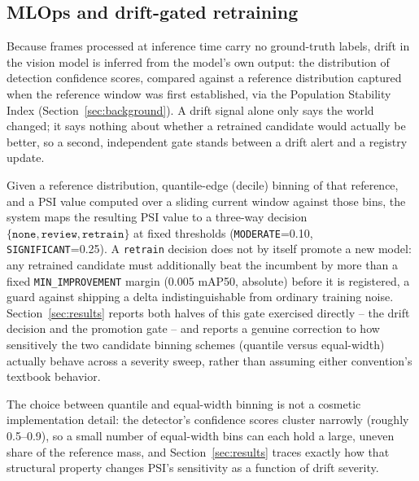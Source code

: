 \subsection{MLOps and drift-gated retraining}
\label{sec:mlops}

Because frames processed at inference time carry no ground-truth labels, drift in the vision model
is inferred from the model's own output: the distribution of detection confidence scores, compared
against a reference distribution captured when the reference window was first established, via the
Population Stability Index
(Section~\ref{sec:background}). A drift signal alone only says the world changed; it says nothing
about whether a retrained candidate would actually be better, so a second, independent gate stands
between a drift alert and a registry update.

\begin{formalization}
\label{form:psigate}
Given a reference distribution, quantile-edge (decile) binning of that reference, and a PSI value
computed over a sliding current window against those bins, the system maps the resulting PSI value
to a three-way decision $\{\texttt{none}, \texttt{review}, \texttt{retrain}\}$ at fixed thresholds
(\texttt{MODERATE}=0.10, \texttt{SIGNIFICANT}=0.25). A \texttt{retrain} decision does not by itself
promote a new model: any retrained candidate must additionally beat the incumbent by more than a
fixed \texttt{MIN\_IMPROVEMENT} margin (0.005 mAP50, absolute) before it is registered, a guard
against shipping a delta indistinguishable from ordinary training noise. Section~\ref{sec:results}
reports both halves of this gate exercised directly -- the drift decision and the promotion gate --
and reports a genuine correction to how sensitively the two candidate binning schemes (quantile
versus equal-width) actually behave across a severity sweep, rather than assuming either
convention's textbook behavior.
\end{formalization}

The choice between quantile and equal-width binning is not a cosmetic implementation detail: the
detector's confidence scores cluster narrowly (roughly 0.5--0.9), so a small number of equal-width
bins can each hold a large, uneven share of the reference mass, and Section~\ref{sec:results}
traces exactly how that structural property changes PSI's sensitivity as a function of drift
severity.
